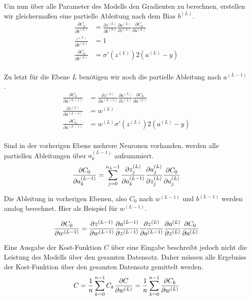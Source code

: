 Um nun über alle Parameter des Modells den Gradienten zu berechnen, erstellen wir gleichermaßen eine partielle Ableitung nach dem Bias $b^{(L)}$.
\begin{align}
    \frac{\partial C_0}{\partial b^{(L)}} &= \frac{\partial z^{(L)}}{\partial b^{(L)}}\frac{\partial a^{(L)}}{\partial z^{(L)}}\frac{\partial C_0}{\partial a^{(L)}}\\
    \frac{z^{(L)}}{\partial b^{(L)}} &= 1\\
    \frac{\partial C_0}{\partial b^{(L)}} &= \sigma'(z^{(L)})2(a^{(L)} - y)\\
\end{align}

Zu letzt für die Ebene $L$ benötigen wir noch die partielle Ableitung nach $a^{(L-1)}$.
\begin{align}
    \frac{\partial C_0}{\partial a^{(L-1)}} &= \frac{\partial z^{(L)}}{\partial a^{(L-1)}}\frac{\partial a^{(L)}}{\partial z^{(L)}}\frac{\partial C_0}{\partial a^{(L)}}\\
    \frac{\partial z^{(L)}}{\partial a^{(L-1)}} &= w^{(L)}\\
    \frac{\partial C_0}{\partial a^{(L-1)}} &= w^{(L)}\sigma'(z^{(L)})2(a^{(L)} - y)\\
\end{align}

Sind in der vorherigen Ebene mehrere Neuronen vorhanden, werden alle partiellen Ableitungen über $a_k^{(L-1)}$ aufsummiert.
\begin{equation}
    \frac{\partial C_0}{\partial a_k^{(L-1)}} = \sum_{j=0}^{n_L-1}\frac{\partial z_j^{(L)}}{\partial a_k^{(L-1)}}\frac{\partial a_j^{(L)}}{\partial z_j^{(L)}}\frac{\partial C_0}{\partial a_j^{(L)}}\\
\end{equation}

Die Ableitung in vorherigen Ebenen, also $C_0$ nach $w^{(L-1)}$ und $b^{(L-1)}$ werden analog berechnet. Hier als Beispiel für $w^{(L-1)}$.

\begin{equation}
    \frac{\partial C_0}{\partial w^{(L-1)}} = \frac{\partial z^{(L-1)}}{\partial w^{(L-1)}}\frac{\partial a^{(L-1)}}{\partial z^{(L-1)}}\frac{\partial z^{(L)}}{\partial a^{(L-1)}}\frac{\partial a^{(L)}}{\partial z^{(L)}}\frac{\partial C_0}{\partial a^{(L)}}\\
\end{equation}

Eine Ausgabe der Kost-Funktion $C$ über eine Eingabe beschreibt jedoch nicht die Leistung des Modells über den gesamten Datensatz. Daher müssen alle Ergebniss der Kost-Funktion über den gesamten Datensatz gemittelt werden. 
\begin{equation}
    C = \frac{1}{n}\sum_{k=0}^{n-1}C_k\\
    \frac{\partial C}{\partial w^{(L)}} = \frac{1}{n}\sum_{k=0}^{n-1}\frac{\partial C_k}{\partial w^{(L)}}	
\end{equation}
